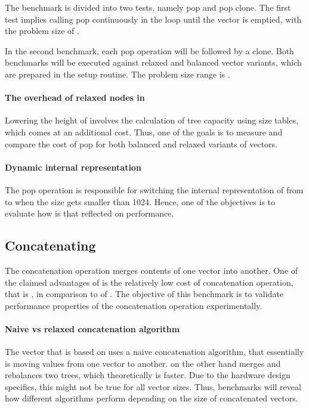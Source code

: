 The benchmark is divided into two tests, namely pop and pop clone. The first test implies calling pop continuously in the loop until the vector is emptied, with the problem size of \range{[10, 60000]}.

In the second benchmark, each pop operation will be followed by a clone. Both benchmarks will be executed against relaxed and balanced vector variants, which are prepared in the setup routine. The problem size range is \range{[10, 20000]}.

\paragraph*{The overhead of relaxed nodes in \rrbtree{}}
Lowering the height of \rrbtree{} involves the calculation of tree capacity using size tables, which comes at an additional cost. Thus, one of the goals is to measure and compare the cost of pop for both balanced and relaxed variants of vectors.

\paragraph*{Dynamic internal representation}
The pop operation is responsible for switching the internal representation of \pvec{} from \rrbvec{} to \stdvec{} when the size gets smaller than 1024. Hence, one of the objectives is to evaluate how is that reflected on performance.

\subsection{Concatenating}
The concatenation operation merges contents of one vector into another. One of the claimed advantages of \rrbtree{} is the relatively low cost of concatenation operation, that is , in comparison to  of \stdvec{}. The objective of this benchmark is to validate performance properties of the concatenation operation experimentally.

\paragraph*{Naive vs relaxed concatenation algorithm}
The vector that is based on \rbtree{} uses a naive concatenation algorithm, that essentially is moving values from one vector to another. \rrbtree{} on the other hand merges and rebalances two trees, which theoretically is faster. Due to the hardware design specifics, this might not be true for all vector sizes. Thus, benchmarks will reveal how different algorithms perform depending on the size of concatenated vectors.

